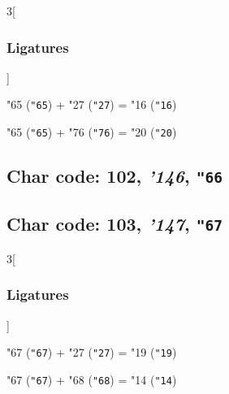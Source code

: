 \documentclass{article}
\newlength{\maxcharwidth}
\begin{document}

\begin{multicols}{3}[\subsubsection{Ligatures}]

{\testfont\char"65\noboundary} ({\tt"65}) + {\testfont\char"27\noboundary} ({\tt"27}) = {\testfont\char"16\noboundary} ({\tt"16}) 

{\testfont\char"65\noboundary} ({\tt"65}) + {\testfont\char"76\noboundary} ({\tt"76}) = {\testfont\char"20\noboundary} ({\tt"20}) 

\end{multicols}

\subsection{Char code: 102, {\it'146}, {\tt"66}}
\label{char_102}


\subsection{Char code: 103, {\it'147}, {\tt"67}}
\label{char_103}


\begin{multicols}{3}[\subsubsection{Ligatures}]

{\testfont\char"67\noboundary} ({\tt"67}) + {\testfont\char"27\noboundary} ({\tt"27}) = {\testfont\char"19\noboundary} ({\tt"19}) 

{\testfont\char"67\noboundary} ({\tt"67}) + {\testfont\char"68\noboundary} ({\tt"68}) = {\testfont\char"14\noboundary} ({\tt"14}) 

\end{multicols}
\end{document}
